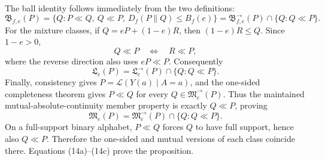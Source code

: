 The ball identity follows immediately from the two definitions:
\[
 \mathfrak B_{f,e}(P)
 =\{Q:P\ll Q,\ Q\ll P,\ D_f(P\|Q)\le B_f(e)\}
 =\mathfrak B^{\to}_{f,e}(P)\cap\{Q:Q\ll P\}. \tag{14a}
\]
For the mixture classes, if \(Q=eP+(1-e)R\), then \((1-e)R\le Q\).  Since \(1-e>0\),
\[
 Q\ll P\quad\Longleftrightarrow\quad R\ll P,
\]
where the reverse direction also uses \(eP\ll P\).  Consequently
\[
 \mathfrak L_e(P)=\mathfrak L^{\to}_e(P)\cap\{Q:Q\ll P\}. \tag{14b}
\]
Finally, consistency gives \(P=\mathcal L(Y(a)\mid A=a)\), and the one-sided completeness theorem gives \(P\ll Q\) for every \(Q\in\mathfrak M^{\to}_e(P)\).  Thus the maintained mutual-absolute-continuity member property is exactly \(Q\ll P\), proving
\[
 \mathfrak M_e(P)=\mathfrak M^{\to}_e(P)\cap\{Q:Q\ll P\}. \tag{14c}
\]
On a full-support binary alphabet, \(P\ll Q\) forces \(Q\) to have full support, hence also \(Q\ll P\).  Therefore the one-sided and mutual versions of each class coincide there.  Equations (14a)--(14c) prove the proposition.